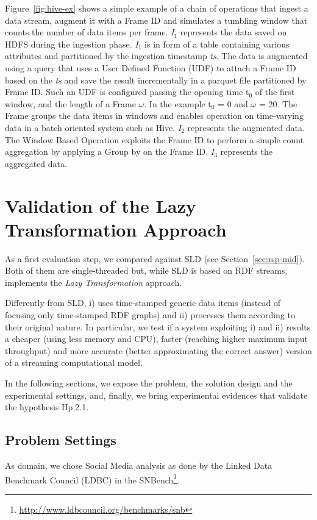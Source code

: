 {Figure~\ref{fig:hive-ex} shows a simple example of a chain of operations that ingest a data stream, augment it with a Frame ID and simulates a tumbling window that counts the number of data items per frame. \textit{I$_1$} represents the data saved on HDFS during the ingestion phase. \textit{I$_1$} is in form of a table containing various attributes and partitioned by the ingestion timestamp \textit{ts}. The data is augmented using a query that uses a User Defined Function (UDF) to attach a Frame ID based on the \textit{ts} and save the result incrementally in a parquet file partitioned by Frame ID. Such an UDF is configured passing the opening time t$_0$ of the first window, and the length of a Frame  $\omega$. In the example t$_0$ = 0 and $\omega$ = 20. The Frame groups the data items in windows and enables operation on time-varying data in a batch oriented system such as Hive. \textit{I$_2$} represents the augmented data. The Window Based Operation exploits the Frame ID to perform a simple count aggregation by applying a Group by on the Frame ID.  \textit{I$_3$} represents the aggregated data.

\section{Validation of the Lazy Transformation Approach} \label{sec:comp-mod-eval-performace}

As a first evaluation step, we compared \sti{} against SLD (see Section~\ref{sec:rsp-mid}). Both of them are single-threaded but, while SLD is based on RDF streams, \sti{} implements the \textit{Lazy Transformation} approach.

Differently from SLD, \sti{} i) uses time-stamped generic data items (instead of focusing only time-stamped RDF graphs) and ii) processes them according to their original nature.
In particular, we test if a system exploiting i) and ii) results a cheaper (using less memory and CPU), faster (reaching higher maximum input throughput) and more accurate (better approximating the correct answer) version of a streaming computational model.

In the following sections, we expose the problem, the solution design and the experimental settings, and, finally, we bring experimental evidences that validate the hypothesis \textsf{Hp.2.1}.

\subsection{Problem Settings}
As domain, we chose Social Media analysis as done by the Linked Data Benchmark Council (LDBC) in the SNBench\footnote{\url{http://www.ldbcouncil.org/benchmarks/snb}}. 

}
